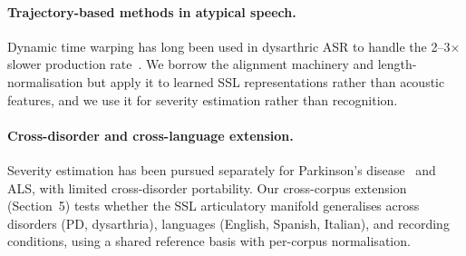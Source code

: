 \paragraph{Trajectory-based methods in atypical speech.} Dynamic time
warping has long been used in dysarthric ASR to handle the 2--3$\times$
slower production
rate~\cite{Bhat2022DTWDysarthria,Salvador2007FastDTW}. We borrow the
alignment machinery and length-normalisation but apply it to learned SSL
representations rather than acoustic features, and we use it for severity
estimation rather than recognition.

\paragraph{Cross-disorder and cross-language extension.} Severity
estimation has been pursued separately for Parkinson's
disease~\cite{Vasquez-Correa2019CNNPD,Pompili2020SSLPD} and ALS, with
limited cross-disorder portability. Our cross-corpus extension (Section~5)
tests whether the SSL articulatory manifold generalises across disorders
(PD, dysarthria), languages (English, Spanish, Italian), and recording
conditions, using a shared reference basis with per-corpus normalisation.
